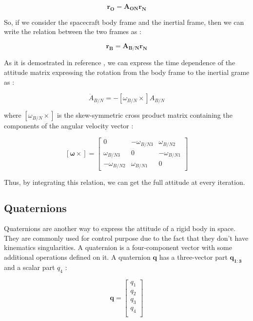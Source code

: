\documentclass[11pt,a4paper]{report}
\begin{document}
\begin{equation}
 \mathbf{r_{O}} = \mathbf{A_{ON}} \mathbf{r_{N}}
\end{equation}

So, if we consider the spacecraft body frame and the inertial frame, then we can write the relation between the two frames as : 

\begin{equation}
 \mathbf{r_{B}} = \mathbf{A_{B/N}} \mathbf{r_{N}}
\end{equation}

As it is demostrated in reference \cite{Ref:Books:Fundamentals}, we can express the time dependence of the attitude matrix expressing the rotation from the body frame to the inertial grame as : 

\begin{equation}
 \dot{A}_{B/N}= - [\omega_{B/N} \times]A_{B/N} 
\end{equation}

where $[\omega_{B/N} \times]$ is the skew-symmetric cross product matrix containing the components of the angular velocity vector : 

\begin{equation*}
 \mathbf{[\omega \times]} =
                                \begin{bmatrix}
                                    0 & -\omega_{B/N 3} & \omega_{B/N 2} \\
                                    \omega_{B/N 3} & 0 & -\omega_{B/N 1} \\
                                    -\omega_{B/N 2} & \omega_{B/N 1} & 0
                                \end{bmatrix}
\end{equation*}

Thus, by integrating this relation, we can get the full attitude at every iteration.

\subsection{Quaternions}
Quaternions are another way to express the attitude of a rigid body in space. They are commonly used for control purpose due to the fact that they don't have kinematics singularities.
A quaternion is a four-component vector with some additional operations defined on it. A quaternion $\mathbf{q}$ has a three-vector part $\mathbf{q_{1:3}}$ and a scalar part $q_{4}$ : 

\begin{equation*}
 \mathbf{q} =
                                \begin{bmatrix}
                                    q_{1}\\
                                    q_{2}\\
                                    q_{3}\\
                                    q_{4}\\
                                \end{bmatrix}
\end{equation*}
\end{document}
